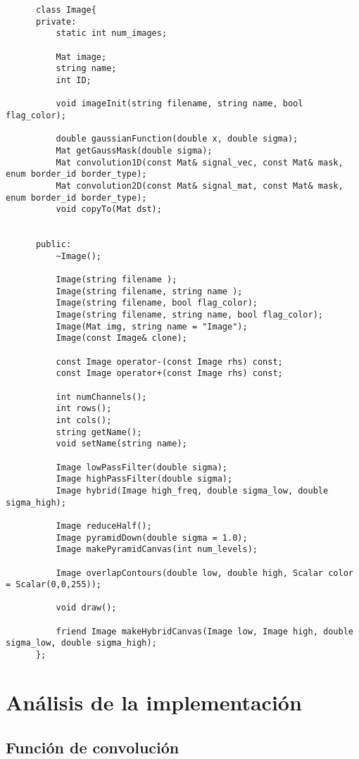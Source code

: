 \documentclass[a4paper, 11pt]{article}
\theoremstyle{definition}
\theoremstyle{theorem}
\begin{document}
  \begin{lstlisting}
      class Image{
      private:
          static int num_images;

          Mat image;
          string name;
          int ID;

          void imageInit(string filename, string name, bool flag_color);

          double gaussianFunction(double x, double sigma);
          Mat getGaussMask(double sigma);
          Mat convolution1D(const Mat& signal_vec, const Mat& mask, enum border_id border_type);
          Mat convolution2D(const Mat& signal_mat, const Mat& mask, enum border_id border_type);
          void copyTo(Mat dst);


      public:
          ~Image();

          Image(string filename );
          Image(string filename, string name );
          Image(string filename, bool flag_color);
          Image(string filename, string name, bool flag_color);
          Image(Mat img, string name = "Image");
          Image(const Image& clone);

          const Image operator-(const Image rhs) const;
          const Image operator+(const Image rhs) const;

          int numChannels();
          int rows();
          int cols();
          string getName();
          void setName(string name);

          Image lowPassFilter(double sigma);
          Image highPassFilter(double sigma);
          Image hybrid(Image high_freq, double sigma_low, double sigma_high);

          Image reduceHalf();
          Image pyramidDown(double sigma = 1.0);
          Image makePyramidCanvas(int num_levels);

          Image overlapContours(double low, double high, Scalar color = Scalar(0,0,255));

          void draw();

          friend Image makeHybridCanvas(Image low, Image high, double sigma_low, double sigma_high);
      };
  \end{lstlisting}

  \newpage
  \section{Análisis de la implementación}

  \subsection{Función de convolución}
\end{document}
